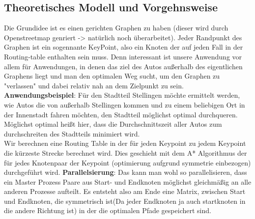 \documentclass[article, paper=A4,pagesize=auto,11pt,headinclude=true,footinclude=true,BCOR=0mm,DIV=calc]{scrartcl}
\begin{document}
\subsection{Theoretisches Modell und Vorgehnsweise}
Die Grundidee ist es einen gerichten Graphen zu haben (dieser wird durch Openstreetmap genriert -> natürlich noch überarbeitet). Jeder Randpunkt des Graphen ist ein sogennante KeyPoint, also ein Knoten der auf jeden Fall in der Routing-table enthalten sein muss. Denn interessant ist unsere Anwendung vor allem für Anwendungen, in denen das ziel des Autos außerhalb des eigentlichen Graphens liegt und man den optimalen Weg sucht, um den Graphen zu "verlassen" und dabei relativ nah an dem Zielpunkt zu sein.\\
\textbf{Anwendungsbeispiel}: Für den Stadtteil Stellingen möchte ermittelt werden, wie Autos die von außerhalb Stellingen kommen und zu einem beliebigen Ort in der Innenstadt fahren möchten, den Stadtteil möglichst optimal durchqueren.\\
Möglichst optimal heißt hier, dass die Durchschnittszeit aller Autos zum durchschreiten des Stadtteils minimiert wird.\\
Wir berechnen eine Routing Table in der für jeden Keypoint zu jedem Keypoint die kürzeste Strecke berechnet wird. Dies geschieht mit dem A* Algorithmus der für jedes Knotenpaar der Keypoint (optimierung aufgrund symmetrie einbezogen) durchgeführt wird. \textbf{Parallelsierung}: Das kann man wohl so parallelisieren, dass ein Master Prozess Paare aus Start- und Endknoten möglichst gleichmäßig an alle anderen Prozesse aufteilt. Es entsteht also am Ende eine Matrix, zwischen Start und Endknoten, die symmetrisch ist(Da jeder Endknoten ja auch startknoten in die andere Richtung ist) in der die optimalen Pfade gespeichert sind. \\
\end{document}
